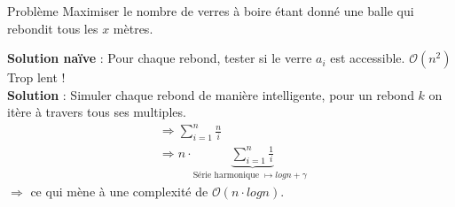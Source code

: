 \begin{frame}
    \frametitle{\problemtitle}
        \begin{block}
            {Problème} Maximiser le nombre de verres à boire étant donné une balle qui rebondit tous les $x$ mètres.
        \end{block}
        \pause
        \textbf{Solution naïve} : Pour chaque rebond, tester si le verre $a_i$ est accessible. $\mathcal O(n^2)$ Trop lent !\\
        \pause
        \textbf{Solution} : Simuler chaque rebond de manière intelligente, pour un rebond $k$ on itère à travers tous ses multiples. \\
        \pause
        \begin{align}
            &\Rightarrow \sum_{i=1}^{n} \frac{n}{i}\\
            &\Rightarrow n \cdot \underbrace{\sum_{i=1}^{n} \frac{1}{i}}_{\text{Série harmonique $\mapsto log n + \gamma$ }}
        \end{align}
        $\Rightarrow$ ce qui mène à une complexité de $\mathcal O(n \cdot log n)$.

\end{frame}
